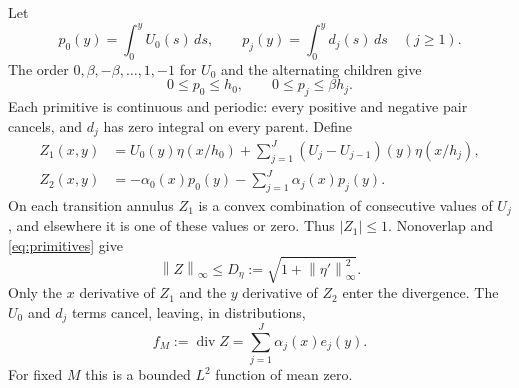 \documentclass[11pt]{article}
\newcommand{\norm}[1]{\left\lVert#1\right\rVert}
\DeclareMathOperator{\diver}{div}
\begin{document}
Let
\[
 p_0(y)=\int_0^yU_0(s)\,ds,\qquad p_j(y)=\int_0^yd_j(s)\,ds\quad(j\geq1).
\]
The order $0,\beta,-\beta,\ldots,1,-1$ for $U_0$ and the alternating
children give
\begin{equation}\label{eq:primitives}
 0\leq p_0\leq h_0,\qquad 0\leq p_j\leq\beta h_j.
\end{equation}
Each primitive is continuous and periodic: every positive and negative
pair cancels, and $d_j$ has zero integral on every parent.
Define
\begin{align*}
 Z_1(x,y)&=U_0(y)\eta(x/h_0)
         +\sum_{j=1}^J(U_j-U_{j-1})(y)\eta(x/h_j),\\
 Z_2(x,y)&=-\alpha_0(x)p_0(y)-\sum_{j=1}^J\alpha_j(x)p_j(y).
\end{align*}
On each transition annulus $Z_1$ is a convex combination of consecutive
values of $U_j$, and elsewhere it is one of these values or zero.
Thus $|Z_1|\leq1$. Nonoverlap and \eqref{eq:primitives} give
\begin{equation}\label{eq:Zbound}
 \norm Z_\infty\leq D_\eta:=\sqrt{1+\norm{\eta'}_\infty^2}.
\end{equation}
Only the $x$ derivative of $Z_1$ and the $y$ derivative of $Z_2$ enter
the divergence. The $U_0$ and $d_j$ terms cancel, leaving, in distributions,
\begin{equation}\label{eq:f}
 f_M:=\diver Z=\sum_{j=1}^J\alpha_j(x)e_j(y).
\end{equation}
For fixed $M$ this is a bounded $L^2$ function of mean zero.
\end{document}
